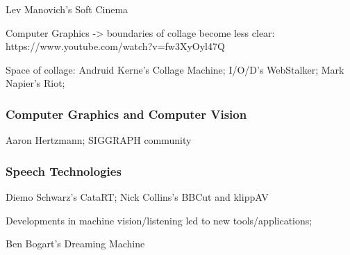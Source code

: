 \documentclass[a4paper,10pt,final]{ThesisStyle}
\begin{document}
Lev Manovich's Soft Cinema

Computer Graphics -> boundaries of collage become less clear: https://www.youtube.com/watch?v=fw3XyOyl47Q

Space of collage: Andruid Kerne's Collage Machine; I/O/D's WebStalker; Mark Napier's Riot; 

\subsubsection{Computer Graphics and Computer Vision}

Aaron Hertzmann; SIGGRAPH community

\subsubsection{Speech Technologies}

Diemo Schwarz's CataRT; Nick Collins's BBCut and klippAV

Developments in machine vision/listening led to new tools/applications;



Ben Bogart's Dreaming Machine

\end{document}
